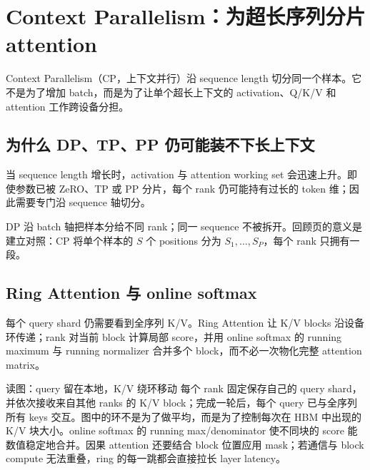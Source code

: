\section{Context Parallelism：为超长序列分片 attention}

Context Parallelism（CP，上下文并行）沿 sequence length 切分同一个样本。它不是为了增加 batch，而是为了让单个超长上下文的 activation、Q/K/V 和 attention 工作跨设备分担。

\subsection{为什么 DP、TP、PP 仍可能装不下长上下文}

当 sequence length 增长时，activation 与 attention working set 会迅速上升。即使参数已被 ZeRO、TP 或 PP 分片，每个 rank 仍可能持有过长的 token 维；因此需要专门沿 sequence 轴切分。


DP 沿 batch 轴把样本分给不同 rank；同一 sequence 不被拆开。回顾页的意义是建立对照：CP 将单个样本的 $S$ 个 positions 分为 $S_1,\ldots,S_P$，每个 rank 只拥有一段。



\subsection{Ring Attention 与 online softmax}

每个 query shard 仍需要看到全序列 K/V。Ring Attention 让 K/V blocks 沿设备环传递；rank 对当前 block 计算局部 score，并用 online softmax 的 running maximum 与 running normalizer 合并多个 block，而不必一次物化完整 attention matrix。


\begin{knowledgebox}{读图：query 留在本地，K/V 绕环移动}
每个 rank 固定保存自己的 query shard，并依次接收来自其他 ranks 的 K/V block；完成一轮后，每个 query 已与全序列所有 keys 交互。图中的环不是为了做平均，而是为了控制每次在 HBM 中出现的 K/V 块大小。online softmax 的 running max/denominator 使不同块的 score 能数值稳定地合并。因果 attention 还要结合 block 位置应用 mask；若通信与 block compute 无法重叠，ring 的每一跳都会直接拉长 layer latency。
\end{knowledgebox}

